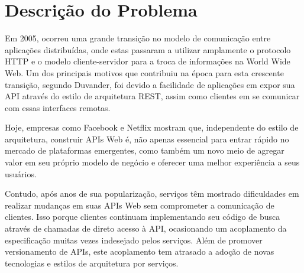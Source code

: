 \section[Descrição do Problema]{Descrição do Problema}

Em 2005, ocorreu uma grande transição no modelo de comunicação entre aplicações distribuídas, onde estas passaram a utilizar amplamente o protocolo HTTP e o modelo cliente-servidor para a troca de informações na World Wide Web. Um dos principais motivos que contribuiu na época para esta crescente transição, segundo Duvander, foi devido a facilidade de aplicações em expor sua API através do estilo de arquitetura REST, assim como clientes em se comunicar com essas interfaces remotas. \cite{Duvander2013-2}

Hoje, empresas como Facebook e Netflix mostram que, independente do estilo de arquitetura, construir APIs Web é, não apenas essencial para entrar rápido no mercado de plataformas emergentes, como também um novo meio de agregar valor em seu próprio modelo de negócio e oferecer uma melhor experiência a seus usuários. \cite{Art2016}

Contudo, após anos de sua popularização, serviços têm mostrado dificuldades em realizar mudanças em suas APIs Web sem comprometer a comunicação de clientes. Isso porque clientes continuam implementando seu código de busca através de chamadas de direto acesso à API, ocasionando um acoplamento da especificação muitas vezes indesejado pelos serviços. Além de promover versionamento de APIs, este acoplamento tem atrasado a adoção de novas tecnologias e estilos de arquitetura por serviços.
